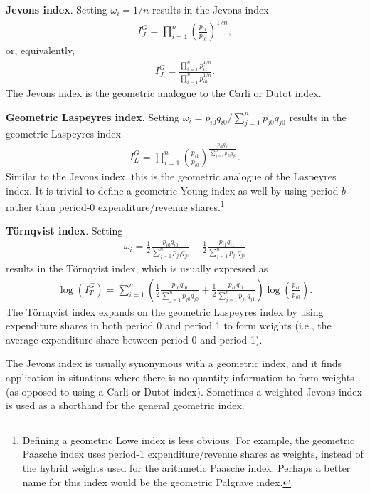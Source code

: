 \documentclass[
]{article}
\begin{document}
\textbf{Jevons index}. Setting \(\omega_{i} = 1 / n\) results in the Jevons index
\begin{align*}
I^{G}_{J} = \prod_{i = 1}^{n} \left(\frac{p_{i1}}{p_{i0}}\right)^{1 / n},
\end{align*}
or, equivalently,
\begin{align*}
I^{G}_{J} = \frac{\prod_{i = 1}^{n} p_{i1}^{1 / n}}{\prod_{i = 1}^{n} p_{i0}^{1 / n}}.
\end{align*}
The Jevons index is the geometric analogue to the Carli or Dutot index.

\textbf{Geometric Laspeyres index}. Setting \(\omega_{i} = p_{i0} q_{i0} / \sum_{j = 1}^{n} p_{j0} q_{j0}\) results in the geometric Laspeyres index
\begin{align*}
I^{G}_{L} = \prod_{i = 1}^{n} \left(\frac{p_{i1}}{p_{i0}}\right)^{\frac{p_{i0} q_{i0}}{\sum_{j = 1}^{n} p_{j0} q_{j0}}}.
\end{align*}
Similar to the Jevons index, this is the geometric analogue of the Laspeyres index. It is trivial to define a geometric Young index as well by using period-\(b\) rather than period-0 expenditure/revenue shares.\footnote{Defining a geometric Lowe index is less obvious. For example, the geometric Paasche index uses period-1 expenditure/revenue shares as weights, instead of the hybrid weights used for the arithmetic Paasche index. Perhaps a better name for this index would be the geometric Palgrave index.}

\textbf{Törnqvist index}. Setting
\begin{align*}
\omega_{i} = \frac{1}{2} \frac{p_{i0} q_{i0}}{\sum_{j = 1}^{n} p_{j0} q_{j0}} + \frac{1}{2} \frac{p_{i1} q_{i1}}{\sum_{j = 1}^{n} p_{j1} q_{j1}}
\end{align*}
results in the Törnqvist index, which is usually expressed as
\begin{align*}
\log(I^{G}_{T}) = \sum_{i = 1}^{n} \left(\frac{1}{2} \frac{p_{i0} q_{i0}}{\sum_{j = 1}^{n} p_{j0} q_{j0}} + \frac{1}{2} \frac{p_{i1} q_{i1}}{\sum_{j = 1}^{n} p_{j1} q_{j1}}\right) \log\left(\frac{p_{i1}}{p_{i0}}\right).
\end{align*}
The Törnqvist index expands on the geometric Laspeyres index by using expenditure shares in both period 0 and period 1 to form weights (i.e., the average expenditure share between period 0 and period 1).

The Jevons index is usually synonymous with a geometric index, and it finds application in situations where there is no quantity information to form weights (as opposed to using a Carli or Dutot index). Sometimes a weighted Jevons index is used as a shorthand for the general geometric index.
\end{document}
